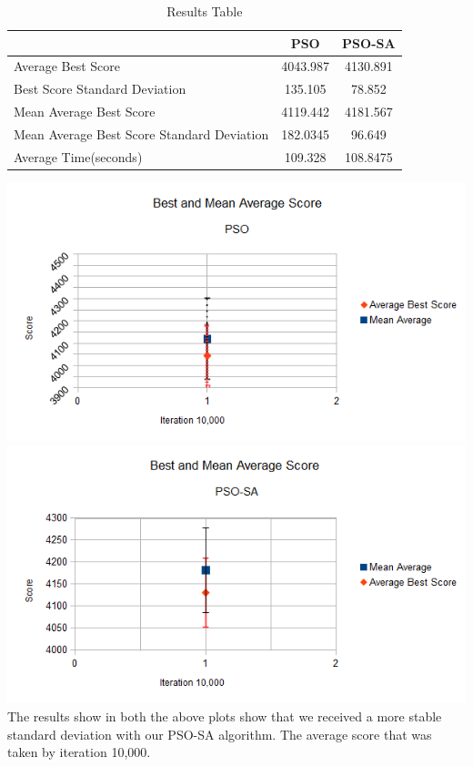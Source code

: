 \documentclass{article}[]
\begin{document}
\begin{table} [b]
\caption{Results Table} %
\centering      %
\begin{tabular}{l|c|c}  %
\hline                      %
{\bf }&{\bf PSO}&{\bf PSO-SA}\\
\hline                    %
Average Best Score & 4043.987 & 4130.891\\
Best Score Standard Deviation &  135.105 & 78.852\\
Mean Average Best Score & 4119.442 & 4181.567\\
Mean Average Best Score Standard Deviation &  182.0345 & 96.649\\
Average Time(seconds) & 109.328 & 108.8475\\
\hline     %
\end{tabular} 
\label{table:results} 
 \end{table} 

\includegraphics[scale=0.8]{bestAndAverageScore-PSO.png}
\includegraphics[scale=0.8]{bestAndAverageScore-PSOSA.png}
The results show in both the above plots show that we received a more stable standard deviation with our PSO-SA algorithm. The average score that was taken by iteration 10,000.
\end{document}
